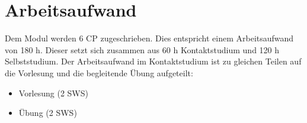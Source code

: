 \section{Arbeitsaufwand}
Dem Modul werden 6 CP zugeschrieben. Dies entspricht einem Arbeitsaufwand von 180 h. Dieser setzt sich zusammen aus 60 h Kontaktstudium und 120 h Selbststudium. Der Arbeitsaufwand im Kontaktstudium ist zu gleichen Teilen auf die Vorlesung und die begleitende Übung aufgeteilt:
\begin{itemize}
\item Vorlesung (2 SWS)
\item Übung (2 SWS)
\end{itemize}
